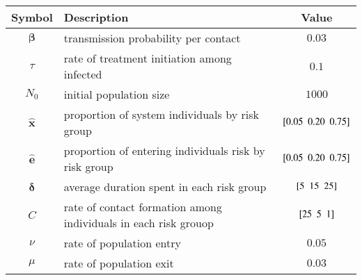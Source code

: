 \begin{tabular}{clc}
	\toprule
	    Symbol     & Description                                                     &            Value             \\
	\midrule
	 $\bm{\beta}$  & transmission probability per contact                            &            $0.03$            \\
	    $\tau$     & rate of treatment initiation among infected                     &            $0.1$             \\
	    $N_0$      & initial population size                                         &            $1000$            \\
	\midrule
	$\bm{\hat{x}}$ & proportion of system individuals by risk group                  & $[ 0.05 \enspace 0.20 \enspace 0.75 ]$ \\
	$\bm{\hat{e}}$ & proportion of entering individuals risk by risk group           & $[ 0.05 \enspace 0.20 \enspace 0.75 ]$ \\
	$\bm{\delta}$  & average duration spent in each risk group                       &    $[ 5 \enspace 15 \enspace 25 ]$     \\
	     $C$       & rate of contact formation among individuals in each risk grouop &     $[ 25 \enspace 5 \enspace 1 ]$     \\
	    $\nu$      & rate of population entry                                        &            $0.05$            \\
	    $\mu$      & rate of population exit                                         &            $0.03$            \\
	\bottomrule
\end{tabular}